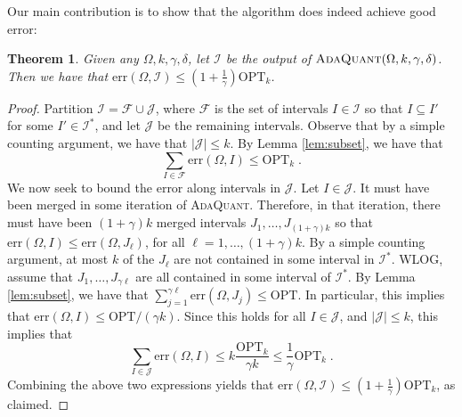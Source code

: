 \documentclass{article}
\newcommand{\err}{\ensuremath{\mathrm{err}}}
\newcommand{\setX}{\Omega}
\newcommand{\setI}{\mathcal{I}}
\newcommand{\OPT}{\ensuremath{\mathrm{OPT}}}
\newcommand{\setF}{\mathcal{F}}
\newcommand{\setJ}{\mathcal{J}}
\newtheorem{theorem}{Theorem}
\begin{document}
Our main contribution is to show that the algorithm does indeed achieve good error:
\begin{theorem}
Given any $\setX, k, \gamma, \delta$, let $\setI$ be the output of $\textsc{AdaQuant} (\setX, k, \gamma, \delta)$.
Then we have that $\err (\setX, \setI) \leq \left( 1 + \frac{1}{\gamma} \right) \OPT_k$.
\end{theorem}
\begin{proof}
Partition $\setI = \setF \cup \setJ$, where $\setF$ is the set of intervals $I \in \setI$ so that $I \subseteq I'$ for some $I' \in \setI^*$, and let $\setJ$ be the remaining intervals.
Observe that by a simple counting argument, we have that $|\setJ| \leq k$.
By Lemma \ref{lem:subset}, we have that 
\[
\sum_{I \in \setF} \err(\setX, I) \leq \OPT_k \; .
\]
We now seek to bound the error along intervals in $\setJ$.
Let $I \in \setJ$.
It must have been merged in some iteration of \textsc{AdaQuant}.
Therefore, in that iteration, there must have been $(1 + \gamma)k$ merged intervals $J_1, \ldots, J_{(1 + \gamma) k}$ so that $\err (\setX, I) \leq \err (\setX, J_\ell)$, for all $\ell = 1, \ldots, (1 + \gamma) k$.
By a simple counting argument, at most $k$ of the $J_\ell$ are not contained in some interval in $\setI^*$.
WLOG, assume that $J_1, \ldots, J_{\gamma \ell}$ are all contained in some interval of $\setI^*$.
By Lemma \ref{lem:subset}, we have that $\sum_{j = 1}^{\gamma \ell} \err (\setX, J_j) \leq \OPT$.
In particular, this implies that $\err (\setX, I) \leq \OPT / (\gamma k)$.
Since this holds for all $I \in \setJ$, and $|\setJ| \leq k$, this implies that 
\[
\sum_{I \in \setJ} \err (\setX, I) \leq k \frac{\OPT_k}{\gamma k} \leq \frac{1}{\gamma} \OPT_k \; .
\]
Combining the above two expressions yields that $\err (\setX, \setI) \leq  \left( 1 + \frac{1}{\gamma} \right) \OPT_k$, as claimed.
\end{proof}




\end{document}
